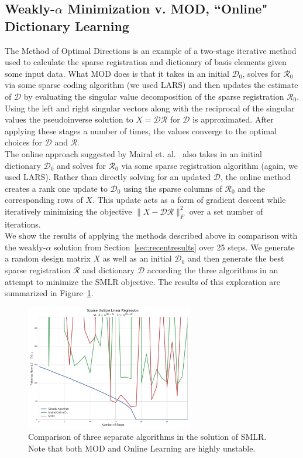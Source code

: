\documentclass{article}
\newcommand{\Rr}{\mathcal{R}}
\newcommand{\D}{\mathcal{D}}
\begin{document}
\subsection{Weakly-$\alpha$ Minimization v. MOD, ``Online" Dictionary Learning}

The Method of Optimal Directions is an example of a two-stage iterative method used to calculate the sparse registration and dictionary of basis elements given some input data. What MOD does is that it takes in an initial $\D_0$, solves for $\Rr_0$ via some sparse coding algorithm (we used LARS) and then updates the estimate of $\D$ by evaluating the singular value decomposition of the sparse registration $\Rr_0$. Using the left and right singular vectors along with the reciprocal of the singular values the pseudoinverse solution to $X = \D\Rr$ for $\D$ is approximated. After applying these stages a number of times, the values converge to the optimal choices for $\D$ and $\Rr$.\\

\noindent The online approach suggested by Mairal et. al.~\cite{mairal09} also takes in an initial dictionary $\D_0$ and solves for $\Rr_0$ via some sparse registration algorithm (again, we used LARS). Rather than directly solving for an updated $\D$, the online method creates a rank one update to $\D_0$ using the sparse columns of $\Rr_0$ and the corresponding rows of $X$. This update acts as a form of gradient descent while iteratively minimizing the objective $\|X-\D\Rr\|_F^2$ over a set number of iterations.\\

\noindent We show the results of applying the methods described above in comparison with the weakly-$\alpha$ solution from Section~\ref{sec:recentresults} over 25 steps. We generate a random design matrix $X$ as well as an initial $\D_0$ and then generate the best sparse registration $\Rr$ and dictionary $\D$ according the three algorithms in an attempt to minimize the SMLR objective. The results of this exploration are summarized in Figure~\ref{fig:smlr}.

\begin{figure}[ht!]
\centering
\includegraphics[width=0.65\textwidth]{src/sparse_MLR_greedy_online.png}
\caption{Comparison of three separate algorithms in the solution of SMLR. Note that both MOD and Online Learning are highly unstable.}
\label{fig:smlr}
\end{figure}
\end{document}
